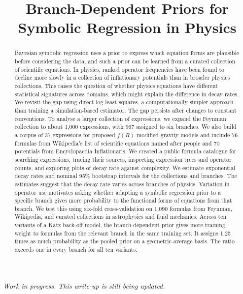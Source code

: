 \documentclass[10pt]{article}
\title{Branch-Dependent Priors for Symbolic Regression in Physics}
\author{}
\date{}
\begin{document}
\maketitle

\begin{center}
\small\itshape Work in progress. This write-up is still being updated.
\end{center}

\begin{abstract}
Bayesian symbolic regression uses a prior to express which equation forms are plausible before considering the data, and such a prior can be learned from a curated collection of scientific equations. In physics, ranked operator frequencies have been found to decline more slowly in a collection of inflationary potentials than in broader physics collections. This raises the question of whether physics equations have different statistical signatures across domains, which might explain the difference in decay rates. We revisit the gap using direct log least squares, a computationally simpler approach than training a simulation-based estimator. The gap persists after changes to constant conventions. To analyse a larger collection of expressions, we expand the Feynman collection to about 1,000 expressions, with 967 assigned to six branches. We also build a corpus of 37 expressions for proposed $f(R)$ modified-gravity models and include 76 formulas from Wikipedia's list of scientific equations named after people and 70 potentials from Encyclopaedia Inflationaris. We created a public formula catalogue for searching expressions, tracing their sources, inspecting expression trees and operator counts, and exploring plots of decay rate against complexity. We estimate exponential decay rates and nominal 95\% bootstrap intervals for the collections and branches. The estimates suggest that the decay rate varies across branches of physics. Variation in operator use motivates asking whether adapting a symbolic regression prior to a specific branch gives more probability to the functional forms of equations from that branch. We test this using six-fold cross-validation on 1,090 formulas from Feynman, Wikipedia, and curated collections in astrophysics and fluid mechanics. Across ten variants of a Katz back-off model, the branch-dependent prior gives more training weight to formulas from the relevant branch in the same training set. It assigns 1.25 times as much probability as the pooled prior on a geometric-average basis. The ratio exceeds one in every branch for all ten variants.
\end{abstract}
\end{document}
